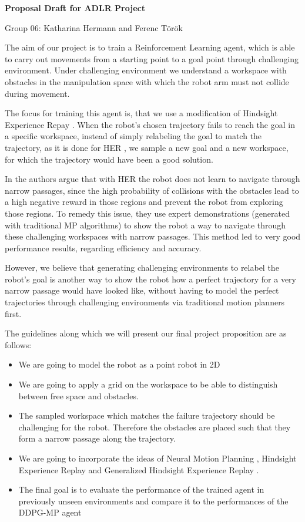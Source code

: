 \documentclass[10pt,oneside,a4paper]{report}
\begin{document}
	
\begin{center}
\huge \textbf{Proposal Draft for ADLR Project}

\bigskip
\Large Group 06: Katharina Hermann and Ferenc Török
\end{center}
\bigskip


The aim of our project is to train a Reinforcement Learning agent, which is able to carry out movements from a starting point to a goal point through challenging environment. Under challenging environment we understand a workspace with obstacles in the manipulation space with which the robot arm must not collide during movement. 

The focus for training this agent is, that we use a modification of Hindsight Experience Repay \cite{HER}. When the robot's chosen trajectory fails to reach the goal in a specific workspace, instead of simply relabeling the goal to match the trajectory, as it is done for HER \cite{HER}, we sample a new goal and a new workspace, for which the trajectory would have been a good solution.

In \cite{NMP} the authors argue that with HER the robot does not learn to navigate through narrow passages, since the high probability of collisions with the obstacles lead to a high negative reward in those regions and prevent the robot from exploring those regions. To remedy this issue, they use expert demonstrations (generated with traditional MP algorithms) to show the robot a way to navigate through these challenging workspaces with narrow passages. This method led to very good performance results, regarding efficiency and accuracy. 

However, we believe that generating challenging environments to relabel the robot's goal is another way to show the robot how a perfect trajectory for a very narrow passage would have looked like, without having to model the perfect trajectories through challenging environments via traditional motion planners first. 



The guidelines along which we will present our final project proposition are as follows:

\begin{itemize}
	\item We are going to model the robot as a point robot in 2D
	\item We are going to apply a grid on the workspace to be able to distinguish between free space and obstacles.
	\item The sampled workspace which matches the failure trajectory should be challenging for the robot. Therefore the obstacles are placed such that they form a narrow passage along the trajectory.
	\item We are going to incorporate the ideas of Neural Motion Planning \cite{NMP}, Hindsight Experience Replay \cite{HER} and Generalized Hindsight Experience Replay \cite{GHER}.
	\item The final goal is to evaluate the performance of the trained agent in previously unseen environments and compare it to the performances of the DDPG-MP agent \cite{NMP}
\end{itemize}
\end{document}

